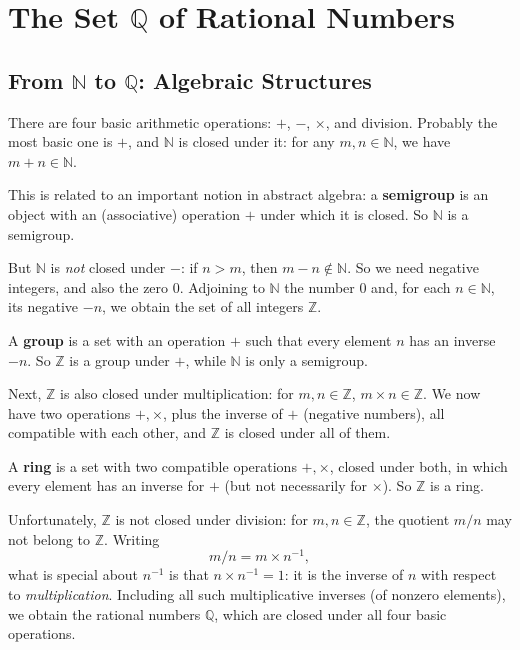 \documentclass[11pt]{report}
\begin{document}
\section{The Set $\mathbb{Q}$ of Rational Numbers}

\subsection{From $\mathbb{N}$ to $\mathbb{Q}$: Algebraic Structures}

There are four basic arithmetic operations: $+$, $-$, $\times$, and division. Probably the most basic one is $+$, and $\mathbb{N}$ is closed under it: for any $m, n \in \mathbb{N}$, we have $m + n \in \mathbb{N}$.

\begin{defbox}[Semigroup]
This is related to an important notion in abstract algebra: a \textbf{semigroup} is an object with an (associative) operation $+$ under which it is closed. So $\mathbb{N}$ is a semigroup.
\end{defbox}

But $\mathbb{N}$ is \emph{not} closed under $-$: if $n > m$, then $m - n \notin \mathbb{N}$. So we need negative integers, and also the zero $0$. Adjoining to $\mathbb{N}$ the number $0$ and, for each $n \in \mathbb{N}$, its negative $-n$, we obtain the set of all integers $\mathbb{Z}$.

\begin{defbox}[Group]
A \textbf{group} is a set with an operation $+$ such that every element $n$ has an inverse $-n$. So $\mathbb{Z}$ is a group under $+$, while $\mathbb{N}$ is only a semigroup.
\end{defbox}

Next, $\mathbb{Z}$ is also closed under multiplication: for $m, n \in \mathbb{Z}$, $m \times n \in \mathbb{Z}$. We now have two operations $+, \times$, plus the inverse of $+$ (negative numbers), all compatible with each other, and $\mathbb{Z}$ is closed under all of them.

\begin{defbox}[Ring]
A \textbf{ring} is a set with two compatible operations $+, \times$, closed under both, in which every element has an inverse for $+$ (but not necessarily for $\times$). So $\mathbb{Z}$ is a ring.
\end{defbox}

Unfortunately, $\mathbb{Z}$ is not closed under division: for $m, n \in \mathbb{Z}$, the quotient $m/n$ may not belong to $\mathbb{Z}$. Writing
\[
m/n = m \times n^{-1},
\]
what is special about $n^{-1}$ is that $n \times n^{-1} = 1$: it is the inverse of $n$ with respect to \emph{multiplication}. Including all such multiplicative inverses (of nonzero elements), we obtain the rational numbers $\mathbb{Q}$, which are closed under all four basic operations.
\end{document}
